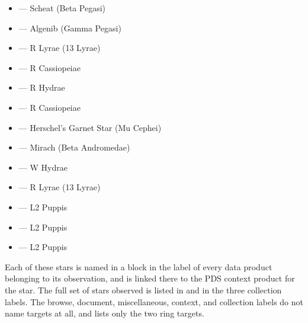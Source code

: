 \begin{itemize}
\item {} — Scheat (Beta Pegasi)
\item {} — Algenib (Gamma Pegasi)
\item {} — R Lyrae (13 Lyrae)
\item {} — R Cassiopeiae
\item {} — R Hydrae
\item {} — R Cassiopeiae
\item {} — Herschel’s Garnet Star (Mu Cephei)
\item {} — Mirach (Beta Andromedae)
\item {} — W Hydrae
\item {} — R Lyrae (13 Lyrae)
\item {} — L2 Puppis
\item {} — L2 Puppis
\item {} — L2 Puppis
\end{itemize}

Each of these stars is named in a  block in the label of every data product belonging to its observation, and is linked there to the PDS context product for the star. The full set of stars observed is listed in  and in the three  collection labels. The browse, document, miscellaneous, context, and  collection labels do not name targets at all, and  lists only the two ring targets.


